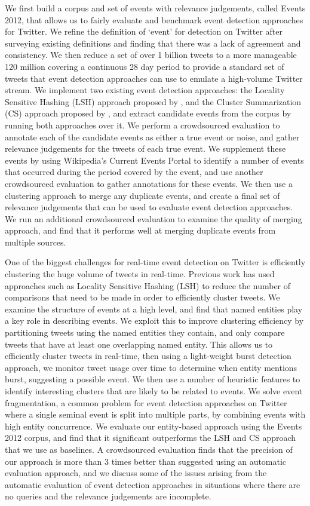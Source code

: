 We first build a corpus and set of events with relevance judgements, called Events 2012, that allows us to fairly evaluate and benchmark event detection approaches for Twitter.
We refine the definition of `event' for detection on Twitter after surveying existing definitions and finding that there was a lack of agreement and consistency.
We then reduce a set of over 1 billion tweets to a more manageable 120 million covering a continuous 28 day period to provide a standard set of tweets that event detection approaches can use to emulate a high-volume Twitter stream.
We implement two existing event detection approaches: the Locality Sensitive Hashing (LSH) approach proposed by \cite{Petrovic10}, and the Cluster Summarization (CS) approach proposed by \cite{Aggarwal12}, and extract candidate events from the corpus by running both approaches over it.
We perform a crowdsourced evaluation to annotate each of the candidate events as either a true event or noise, and gather relevance judgements for the tweets of each true event.
We supplement these events by using Wikipedia's Current Events Portal to identify a number of events that occurred during the period covered by the event, and use another crowdsourced evaluation to gather annotations for these events.
We then use a clustering approach to merge any duplicate events, and create a final set of relevance judgements that can be used to evaluate event detection approaches.
We run an additional crowdsourced evaluation to examine the quality of merging approach, and find that it performs well at merging duplicate events from multiple sources.

One of the biggest challenges for real-time event detection on Twitter is efficiently clustering the huge volume of tweets in real-time.
Previous work has used approaches such as Locality Sensitive Hashing (LSH) \citep{Petrovic10} to reduce the number of comparisons that need to be made in order to efficiently cluster tweets.
We examine the structure of events at a high level, and find that named entities play a key role in describing events.
We exploit this to improve clustering efficiency by partitioning tweets using the named entities they contain, and only compare tweets that have at least one overlapping named entity.
This allows us to efficiently cluster tweets in real-time, then using a light-weight burst detection approach, we monitor tweet usage over time to determine when entity mentions burst, suggesting a possible event.
We then use a number of heuristic features to identify interesting clusters that are likely to be related to events.
We solve event fragmentation, a common problem for event detection approaches on Twitter where a single seminal event is split into multiple parts, by combining events with high entity concurrence.
We evaluate our entity-based approach using the Events 2012 corpus, and find that it significant outperforms the LSH and CS approach that we use as baselines.
A crowdsourced evaluation finds that the precision of our approach is more than 3 times better than suggested using an automatic evaluation approach, and we discuss some of the issues arising from the automatic evaluation of event detection approaches in situations where there are no queries and the relevance judgements are incomplete.

